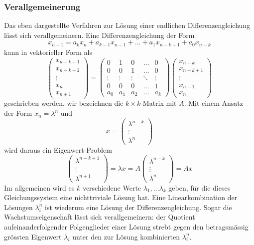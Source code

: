 \subsubsection{Verallgemeinerung}
Das eben dargestellte Verfahren zur Lösung einer endlichen
Differenzengleichung lässt sich verallgemeinern.
Eine Differenzengleichung der Form
\[
x_{n+1}=a_kx_n+a_{k-1}x_{n-1}+\dots+a_1x_{n-k+1}+a_0x_{n-k}
\]
kann in vektorieller Form als
\[
\begin{pmatrix}
x_{n-k+1}\\
x_{n-k+2}\\
\vdots\\
x_{n}\\
x_{n+1}
\end{pmatrix}
=
\begin{pmatrix}
0&1&0&\dots&0\\
0&0&1&\dots&0\\
\vdots&\vdots&\vdots&\ddots&\vdots\\
0&0&0&\dots&1\\
a_0&a_1&a_2&\dots&a_k
\end{pmatrix}
\begin{pmatrix}
x_{n-k}\\
x_{n-k+1}\\
\vdots\\
x_{n-1}\\
x_n
\end{pmatrix}
\]
geschrieben werden, wir bezeichnen die $k\times k$-Matrix mit $A$.
Mit einem Ansatz der Form $x_n=\lambda^n$ und
\[
x=
\begin{pmatrix}
\lambda^{n-k}\\
\vdots\\
\lambda^n
\end{pmatrix}
\]
wird daraus ein
Eigenwert-Problem
\[
\begin{pmatrix}
\lambda^{n-k+1}\\
\vdots\\
\lambda^{n+1}
\end{pmatrix}
=
\lambda x
=A
\begin{pmatrix}
\lambda^{n-k}\\
\vdots\\
\lambda^n
\end{pmatrix}
=Ax
\]
Im allgemeinen wird es $k$ verschiedene Werte $\lambda_1,\dots\lambda_k$ geben,
für die dieses Gleichungssystem eine nichttriviale Lösung hat.
Eine Linearkombination der Lösungen $\lambda_i^n$ ist wiederum eine
Lösung der Differenzengleichung.
Sogar die Wachstumseigenschaft lässt
sich verallgemeinern: der Quotient aufeinanderfolgender Folgenglieder
einer Lösung strebt gegen den betragsmässig grössten Eigenwert $\lambda_i$
unter den zur Lösung kombinierten $\lambda_i^n$.

